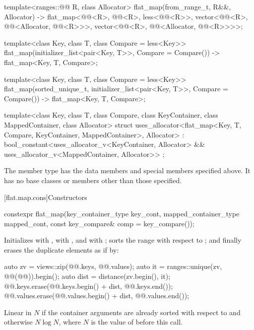 \begin{codeblock}
{  template<ranges::@@ R, class Allocator>
    flat_map(from_range_t, R&&, Allocator)
      -> flat_map<@@<R>, @@<R>, less<@@<R>>,
                  vector<@@<R>, @@<Allocator, @@<R>>>,
                  vector<@@<R>, @@<Allocator, @@<R>>>>;

  template<class Key, class T, class Compare = less<Key>>
    flat_map(initializer_list<pair<Key, T>>, Compare = Compare())
      -> flat_map<Key, T, Compare>;

  template<class Key, class T, class Compare = less<Key>>
    flat_map(sorted_unique_t, initializer_list<pair<Key, T>>, Compare = Compare())
        -> flat_map<Key, T, Compare>;

  template<class Key, class T, class Compare, class KeyContainer, class MappedContainer,
            class Allocator>
    struct uses_allocator<flat_map<Key, T, Compare, KeyContainer, MappedContainer>, Allocator>
      : bool_constant<uses_allocator_v<KeyContainer, Allocator> &&
                      uses_allocator_v<MappedContainer, Allocator>> { };
}
\end{codeblock}

\pnum
The member type  has the data members and special members
specified above.
It has no base classes or members other than those specified.

[flat.map.cons]{Constructors}

%
\begin{itemdecl}
constexpr flat_map(key_container_type key_cont, mapped_container_type mapped_cont,
                   const key_compare& comp = key_compare());
\end{itemdecl}

\begin{itemdescr}
\pnum
\effects
Initializes
 with ,
 with , and
 with ;
sorts the range  with respect to ; and
finally erases the duplicate elements as if by:
\begin{codeblock}
auto zv = views::zip(@@.keys, @@.values);
auto it = ranges::unique(zv, @@(@@)).begin();
auto dist = distance(zv.begin(), it);
@@.keys.erase(@@.keys.begin() + dist, @@.keys.end());
@@.values.erase(@@.values.begin() + dist, @@.values.end());
\end{codeblock}

\pnum
\complexity
Linear in $N$ if the container arguments are already sorted
with respect to  and otherwise $N \log N$,
where $N$ is the value of  before this call.
\end{itemdescr}

